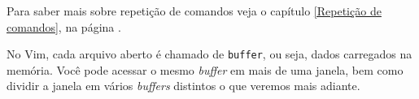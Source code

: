 Para saber mais sobre repetição de comandos veja o capítulo \ref{Repetição de comandos},
na página \pageref{Repetição de comandos}.

No Vim, cada arquivo aberto é chamado de \verb|buffer|, ou seja, dados
carregados na memória. Você pode acessar o mesmo {\em buffer} em mais de uma
janela, bem como dividir a janela em vários {\em buffers} distintos o que veremos
mais adiante.


